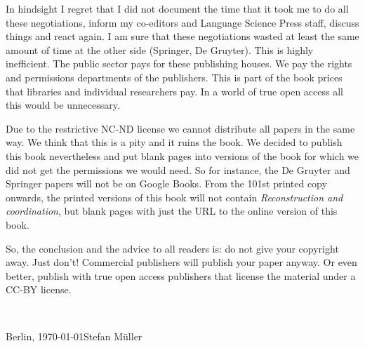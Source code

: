 \begin{refsection}
\begin{table}
\caption{\label{tab-interaction-with-publishers}Interaction with publishers and results}
\end{table}

In hindsight I regret that I did not document the time that it took me to do all these negotiations, inform
my co-editors and Language Science Press staff, discuss things and react again. I am sure that these
negotiations wasted at least the same amount of time at the other side (Springer, De Gruyter). This is highly
inefficient. The public sector pays for these publishing houses. We pay the rights and
permissions departments of the publishers. This is part of the book prices that libraries and
individual researchers pay. In a world of true open access all this would be unnecessary.

Due to the restrictive NC-ND license we cannot distribute all papers in the same way. We think that
this is a pity and it ruins the book. We decided to publish this book nevertheless and put blank pages
into versions of the book for which we did not get the permissions we would need. So for instance,
the De Gruyter and Springer papers will not be on Google Books. From the 101st printed copy onwards,
the printed versions of this book will not contain \emph{Reconstruction and coordination}, but blank pages with just the URL to the online
version of this book.

So, the conclusion and the advice to all readers is: do not give your copyright away. Just don't!
Commercial publishers will publish your paper anyway. Or even better, publish with true open access publishers that
license the material under a CC-BY license.

~\medskip

\noindent
Berlin, \today\hfill Stefan Müller








\printbibliography[heading=subbibliography,notkeyword=this]
\end{refsection}


